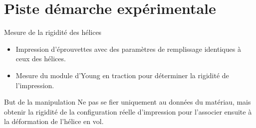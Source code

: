 \documentclass[aspectratio=169]{beamer}
\begin{document}
\section{Piste démarche expérimentale}

\begin{frame}{Mesure de la rigidité des hélices}
  \begin{itemize}
    \item Impression d'éprouvettes avec des \alert{paramètres de remplissage identiques} à ceux des hélices.
    \item \alert{Mesure du module d'Young en traction} pour déterminer la rigidité de l'impression.
  \end{itemize}
  \vspace{0.4cm}

  \begin{block}{But de la manipulation}
    Ne pas se fier uniquement au données du matériau, mais obtenir la rigidité de la configuration réelle d'impression pour l'associer ensuite à la déformation de l'hélice en vol.
  \end{block}
\end{frame}
\end{document}
